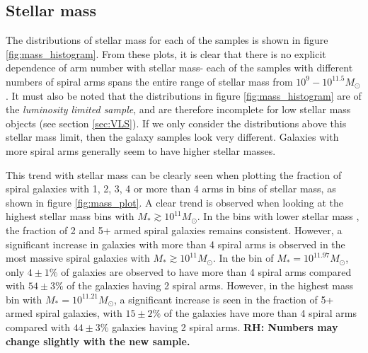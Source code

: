 \documentclass[useAMS,usenatbib]{mn2e}
\newcommand{\rh}[1]{{\bf \textcolor{RoyalPurple}{RH: #1}}}
\begin{document}
\subsection{Stellar mass}
\label{sec:mass}

The distributions of stellar mass for each of the samples is shown in figure \ref{fig:mass_histogram}. From these plots, it is clear that there is no explicit dependence of arm number with stellar mass- each of the samples with different numbers of spiral arms spans the entire range of stellar mass from $10^{9} - 10^{11.5} M_{\odot}$. It must also be noted that the distributions in figure \ref{fig:mass_histogram} are of the \textit{luminosity limited sample}, and are therefore incomplete for low stellar mass objects (see section \ref{sec:VLS}). If we only consider the distributions above this stellar mass limit, then the galaxy samples look very different. Galaxies with more spiral arms generally seem to have higher stellar masses.

This trend with stellar mass can be clearly seen when plotting the fraction of spiral galaxies with 1, 2, 3, 4 or more than 4 arms in bins of stellar mass, as shown in figure \ref{fig:mass_plot}. A clear trend is observed when looking at the highest stellar mass bins with $M_* \gtrsim 10^{11} M_{\odot}$. In the bins with lower stellar mass , the fraction of 2 and 5+ armed spiral galaxies remains consistent. However, a significant increase in galaxies with more than 4 spiral arms is observed in the most massive spiral galaxies with $M_* \gtrsim 10^{11} M_{\odot}$. In the bin of $M_* = 10^{11.97}M_{\odot}$, only $4 \pm 1 \%$ of galaxies are observed to have more than 4 spiral arms compared with $54 \pm 3 \%$ of the galaxies having 2 spiral arms. However, in the highest mass bin with $M_* = 10^{11.21}M_{\odot}$, a significant increase is seen in the fraction of 5+ armed spiral galaxies, with $15 \pm 2 \%$ of the galaxies have more than 4 spiral arms compared with $44 \pm 3 \%$ galaxies having 2 spiral arms. \rh{Numbers may change slightly with the new sample.}
\end{document}
